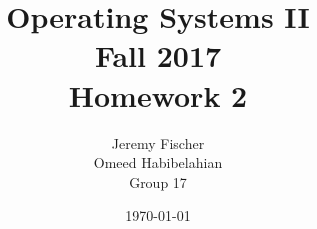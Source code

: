 \documentclass[draftclsnofoot, onecolumn, 10pt, compsoc]{IEEEtran}
\title{\textbf{Operating Systems II}\\Fall 2017\\Homework 2}
\author{Jeremy Fischer\\Omeed Habibelahian\\Group 17}
\date{\today}
\begin{document}
	\maketitle
	\begin{abstract}
	\end{abstract}
	\newpage

	
	
\end{document}
